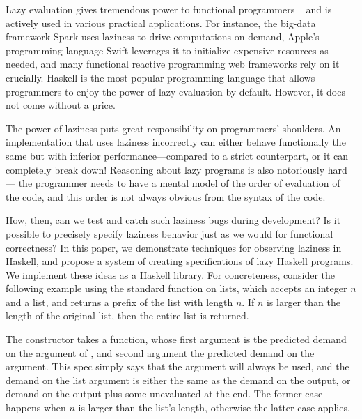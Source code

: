 \documentclass[acmsmall,review]{acmart}\settopmatter{}
\begin{document}
Lazy evaluation gives tremendous power to functional programmers
~\cite{WhyFPMatters} and is actively used in various practical
applications. For instance, the big-data framework Spark uses laziness
to drive computations on demand\cn, Apple's programming language Swift
leverages it to initialize expensive resources as needed\cn, and many
functional reactive programming web frameworks rely on
it crucially\cn {}. Haskell
is the most popular programming language that allows programmers to
enjoy the power of lazy evaluation by default. However, it
does not come without a price.

The power of laziness puts great responsibility on programmers'
shoulders. An implementation that uses laziness incorrectly can either
behave functionally the same but with inferior  performance---compared to a strict counterpart, or it can
completely break down! Reasoning about lazy
programs is also notoriously hard --- the programmer needs to have a
mental model of the order of evaluation of the code, and this order is
not always obvious from the syntax of the code.

How, then, can we test and catch such laziness bugs during
development? Is it possible to precisely specify laziness behavior
just as we would for functional correctness?
%
In this paper, we demonstrate techniques for observing laziness in
Haskell, and propose a system of creating specifications of lazy
Haskell programs. We implement these ideas as a Haskell library. For
concreteness, consider the following example using the standard
 function on lists, which accepts an integer $n$ and a list, and returns
a prefix of the list with length $n$. If $n$ is larger than the length
of the original list, then the entire list is returned.
%
%
The  constructor takes a function, whose first
argument  is the predicted demand on the  argument
of , and second argument the predicted demand on the \lk{[a]}
argument. This spec simply says that the  argument will always
be used, and the demand on the list argument is either the same as the
demand on the output, or demand on the output plus some
unevaluated  at the end. The former case happens when $n$ is
larger than the list's length, otherwise the latter case applies.
\end{document}
